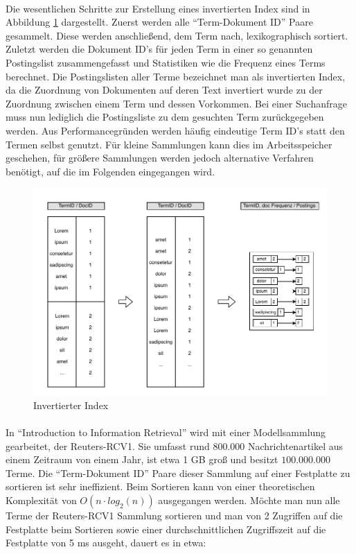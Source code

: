 \paragraph{}
Die wesentlichen Schritte zur Erstellung eines invertierten Index sind in Abbildung \ref{postingssList} dargestellt. Zuerst werden alle \enquote{Term-Dokument ID} Paare gesammelt. Diese werden anschließend, dem Term nach, lexikographisch sortiert. Zuletzt werden die Dokument ID's für jeden Term in einer so genannten Postingslist zusammengefasst und Statistiken wie die Frequenz eines Terms berechnet. Die Postingslisten aller Terme bezeichnet man als invertierten Index, da die Zuordnung von Dokumenten auf deren Text invertiert wurde zu der Zuordnung zwischen einem Term und dessen Vorkommen. Bei einer Suchanfrage muss nun lediglich die Postingsliste zu dem gesuchten Term zurückgegeben werden. Aus Performancegründen werden häufig eindeutige Term ID's statt den Termen selbst genutzt. Für kleine Sammlungen kann dies im Arbeitsspeicher geschehen, für größere Sammlungen werden jedoch alternative Verfahren benötigt, auf die im Folgenden eingegangen wird.
\par

\begin{figure}[ht]
  \includegraphics[width=\textwidth,height=0.4\textheight]{pdf/postingslist3.pdf}
  \caption{Invertierter Index}
  \label{postingssList}
\end{figure}

\paragraph{}
In \enquote{Introduction to Information Retrieval}\cite{ir} wird mit einer Modellsammlung gearbeitet, der Reuters-RCV1. Sie umfasst rund $800.000$ Nachrichtenartikel aus einem Zeitraum von einem Jahr, ist etwa 1 GB groß und besitzt $100.000.000$ Terme. Die \enquote{Term-Dokument ID} Paare dieser Sammlung auf einer Festplatte zu sortieren ist sehr ineffizient. Beim Sortieren kann von einer theoretischen Komplexität von $O(n \cdot log_2 (n))$ ausgegangen werden. Möchte man nun alle Terme der Reuters-RCV1 Sammlung sortieren und man von 2 Zugriffen auf die Festplatte beim Sortieren sowie einer durchschnittlichen Zugriffszeit auf die Festplatte von 5 ms ausgeht, dauert es in etwa:

